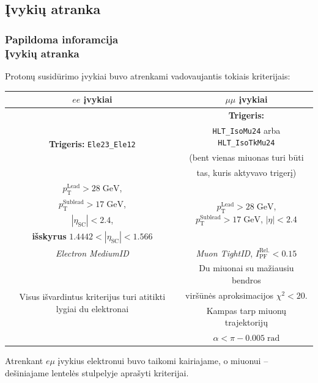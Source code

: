 \documentclass[xcolor=dvipsnames]{beamer}
\newcommand{\ttt}[1]{\texttt{#1}}
\newcommand{\emu}{\mathit{e}\mu}
\newcommand{\ee}{\mathit{ee}}
\newcommand{\mumu}{\mu\mu}
\begin{document}
\begin{frame}
	\subsection{Įvykių atranka}
	\frametitle{Papildoma inforamcija\\ \small Įvykių atranka}
	Protonų susidūrimo įvykiai buvo atrenkami vadovaujantis tokiais kriterijais:
	\vspace{-0.2cm}
	\begin{center}
		\footnotesize
		\begin{tabular}{|c|c|}
			\hline
			$\ee$ įvykiai & $\mumu$ įvykiai \\
			\hline\hline
			\multirow{4}{6em}{\centering\textbf{Trigeris:} \ttt{Ele23\_Ele12}} & \textbf{Trigeris:} \\
			& \ttt{HLT\_IsoMu24} arba \ttt{HLT\_IsoTkMu24} \\
			& (bent vienas miuonas turi būti \\
			& tas, kuris aktyvavo trigerį) \\
			\hline
			
			$\mathit{p}_{\mathrm{T}}^{\mathrm{Lead}} > 28 \; \mathrm{GeV}$, &
				\multirow{4}{10em}{\centering$\mathit{p}_{\mathrm{T}}^{\mathrm{Lead}} > 28 \; \mathrm{GeV}$,
				$\mathit{p}_{\mathrm{T}}^{\mathrm{Sublead}} > 17 \; \mathrm{GeV}$,
				$|\eta| < 2.4$} \\
			$\mathit{p}_{\mathrm{T}}^{\mathrm{Sublead}} > 17 \; \mathrm{GeV}$, & \\
			$|\eta_{\mathrm{SC}}| < 2.4$, & \\
			\textbf{išskyrus} $1.4442 < |\eta_{\mathrm{SC}}| < 1.566$ & \\
			\hline
			\textit{Electron MediumID} & \textit{Muon TightID}, $\mathit{I}_{\mathrm{PF}}^{\mathrm{Rel.}} < 0.15$  \\
			\hline
			\multirow{4}{13em}{\centering Visus išvardintus kriterijus turi atitikti lygiai du elektronai} & Du miuonai su mažiausiu bendros \\
			& viršūnės aproksimacijos $\chi^2 < 20$. \\
			& Kampas tarp miuonų trajektorijų \\
			& $\alpha < \pi - 0.005 \; \mathrm{rad}$ \\
			\hline
		\end{tabular}
	\end{center}
	Atrenkant $\emu$ įvykius elektronui buvo taikomi kairiajame, o miuonui -- dešiniajame lentelės stulpelyje aprašyti kriterijai.
\end{frame}
\end{document}

